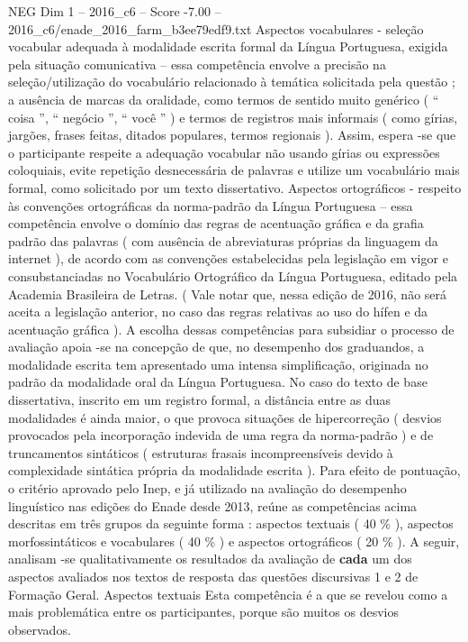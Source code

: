 \begin{textsample}{NEG Dim 1 – 2016\_c6 – Score -7.00 – 2016\_c6/enade\_2016\_farm\_b3ee79edf9.txt}
Aspectos vocabulares - seleção vocabular adequada à modalidade escrita formal da Língua Portuguesa, exigida pela situação comunicativa – essa competência envolve a precisão na seleção/utilização do vocabulário relacionado à temática solicitada pela questão ; a ausência de marcas da oralidade, como termos de sentido muito genérico ( “ coisa ”, “ negócio ”, “ você ” ) e termos de registros mais informais ( como gírias, jargões, frases feitas, ditados populares, termos regionais ).
Assim, espera -se que o participante respeite a adequação vocabular não usando gírias ou expressões coloquiais, evite repetição desnecessária de palavras e utilize um vocabulário mais formal, como solicitado por um texto dissertativo.
Aspectos ortográficos - respeito às convenções ortográficas da norma-padrão da Língua Portuguesa – essa competência envolve o domínio das regras de acentuação gráfica e da grafia padrão das palavras ( com ausência de abreviaturas próprias da linguagem da internet ), de acordo com as convenções estabelecidas pela legislação em vigor e consubstanciadas no Vocabulário Ortográfico da Língua Portuguesa, editado pela Academia Brasileira de Letras. ( Vale notar que, nessa edição de 2016, não será aceita a legislação anterior, no caso das regras relativas ao uso do hífen e da acentuação gráfica ).
A escolha dessas competências para subsidiar o processo de avaliação apoia -se na concepção de que, no desempenho dos graduandos, a modalidade escrita tem apresentado uma intensa simplificação, originada no padrão da modalidade oral da Língua Portuguesa.
No caso do texto de base dissertativa, inscrito em um registro formal, a distância entre as duas modalidades é ainda maior, o que provoca situações de hipercorreção ( desvios provocados pela incorporação indevida de uma regra da norma-padrão ) e de truncamentos sintáticos ( estruturas frasais incompreensíveis devido à complexidade sintática própria da modalidade escrita ).
Para efeito de pontuação, o critério aprovado pelo Inep, e já utilizado na avaliação do desempenho linguístico nas edições do Enade desde 2013, reúne as competências acima descritas em três grupos da seguinte forma : aspectos textuais ( 40 \% ), aspectos morfossintáticos e vocabulares ( 40 \% ) e aspectos ortográficos ( 20 \% ).
A seguir, analisam -se qualitativamente os resultados da avaliação de \textbf{cada} um dos aspectos avaliados nos textos de resposta das questões discursivas 1 e 2 de Formação Geral.
Aspectos textuais Esta competência é a que se revelou como a mais problemática entre os participantes, porque são muitos os desvios observados.

\end{textsample}
